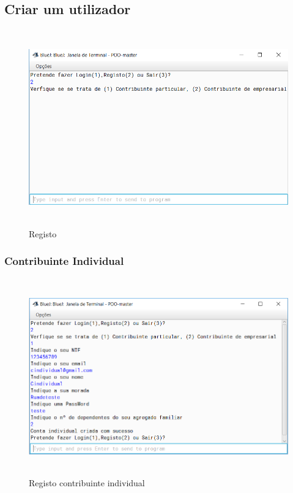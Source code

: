 \documentclass[a4paper]{article}
\begin{document}
	\subsection{Criar um utilizador}

		\begin{figure}[htbp]
			\centering
			\includegraphics[width = 420pt,height = 240pt]{registo.png}
			\caption{Registo}
		\end{figure}

		\subsubsection{Contribuinte Individual}

			\begin{figure}[htbp]
				\centering
				\includegraphics[width = 420pt,height = 240pt]{CI.png}
				\caption{Registo contribuinte individual}
			\end{figure}
\end{document}

